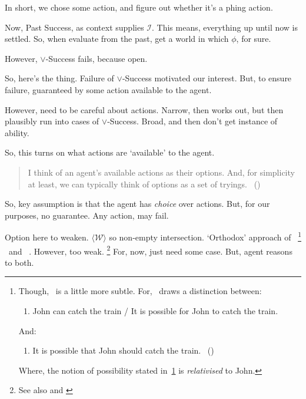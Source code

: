 \begin{note}
  In short, we chose some action, and figure out whether it's a phing action.

  Now, Past Success, as context supplies \(\mathcal{I}\).
  This means, everything up until now is settled.
  So, when evaluate from the past, get a world in which \(\phi\), for sure.

  However, \(\lor\)-Success fails, because open.

  So, here's the thing.
  Failure of \(\lor\)-Success motivated our interest.
  But, to ensure failure, guaranteed by some action available to the agent.

  However, need to be careful about actions.
  Narrow, then works out, but then plausibly run into cases of \(\lor\)-Success.
  Broad, and then don't get instance of ability.

  So, this turns on what actions are `available' to the agent.
  \begin{quote}
    I think of an agent’s available actions as their options.
    And, for simplicity at least, we can typically think of options as a set of tryings.\newline
    \mbox{ }\hfill\mbox{(\citeyear[14]{Boylan:2020aa})}
  \end{quote}

  So, key assumption is that the agent has \emph{choice} over actions.
  But, for our purposes, no guarantee.
  Any action, may fail.
\end{note}

\begin{note}
  Option here to weaken.
  \(\langle \mathcal{W} \rangle\) so non-empty intersection.
  `Orthodox' approach of~\textcite{Hilpinen:1969vw}%
  \footnote{
    Though,~\citeauthor{Hilpinen:1969vw} is a little more subtle.
    For,~\citeauthor{Hilpinen:1969vw} draws a distinction between:
    \begin{enumerate}[label=(A\(^{/}{'}\)), ref=(A\(^{/}{'}\))]
    \item
      \label{Hilpinen:A}
      John can catch the train / It is possible for John to catch the train.
    \end{enumerate}
    And:
    \begin{enumerate}[label=(C), ref=(C)]
    \item
      \label{Hilpinen:C}
      It is possible that John should catch the train.%
      \mbox{ }\hfill\mbox{(\citeyear[181--182]{Hilpinen:1969vw})}
    \end{enumerate}
    Where, the notion of possibility stated in~\ref{Hilpinen:A} is \emph{relativised} to John.
  }
  \textcite{Kratzer:1977aa,Kratzer:1981vn}~and ~\textcite{Lewis:1976us}.
  However, too weak.%
  \footnote{
    See also \textcite[\S1.3]{Boylan:2020aa} and \textcite[\S2]{Mandelkern:2017aa}
  }
  For, now, just need some case.
  But, agent reasons to both.
\end{note}

